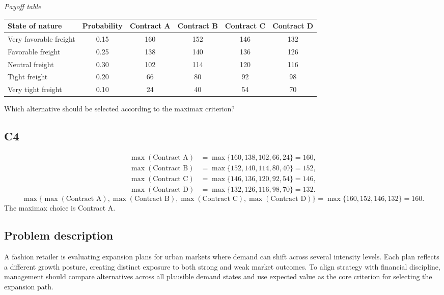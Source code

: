 \begin{ExamProblems}
		\begin{center}
			\textit{Payoff table}
			\begin{tabular}{l c c c c c}
				\toprule
				State of nature & Probability & Contract A & Contract B & Contract C & Contract D \\
				\midrule
				Very favorable freight & 0.15 & 160 & 152 & 146 & 132 \\
				Favorable freight & 0.25 & 138 & 140 & 136 & 126 \\
				Neutral freight & 0.30 & 102 & 114 & 120 & 116 \\
				Tight freight & 0.20 & 66 & 80 & 92 & 98 \\
				Very tight freight & 0.10 & 24 & 40 & 54 & 70 \\
				\bottomrule
			\end{tabular}
		\end{center}

		Which alternative should be selected according to the maximax criterion?

		\subsection*{C4}
		\[
		\begin{aligned}
		\max(\text{Contract A}) &= \max\{160,138,102,66,24\} = 160,\\
		\max(\text{Contract B}) &= \max\{152,140,114,80,40\} = 152,\\
		\max(\text{Contract C}) &= \max\{146,136,120,92,54\} = 146,\\
		\max(\text{Contract D}) &= \max\{132,126,116,98,70\} = 132.
		\end{aligned}
		\]
		\[
		\max\{\max(\text{Contract A}),\max(\text{Contract B}),\max(\text{Contract C}),\max(\text{Contract D})\}
		= \max\{160,152,146,132\}
		= 160.
		\]
		The maximax choice is Contract A.
		\item
		\subsection*{Problem description}
		A fashion retailer is evaluating expansion plans for urban markets where demand can shift across several intensity levels. Each plan reflects a different growth posture, creating distinct exposure to both strong and weak market outcomes. To align strategy with financial discipline, management should compare alternatives across all plausible demand states and use expected value as the core criterion for selecting the expansion path.


\end{ExamProblems}
